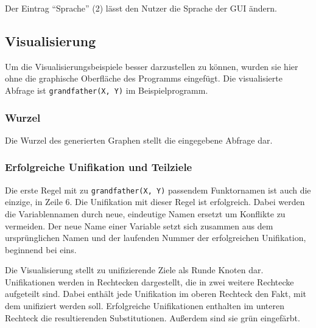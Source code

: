 \documentclass[parskip=full,11pt,twoside]{scrartcl}
\begin{document}
Der Eintrag \enquote{Sprache} (2) lässt den Nutzer die Sprache der GUI ändern.

\subsection{Visualisierung}

Um die Visualisierungsbeispiele besser darzustellen zu können, wurden sie hier ohne die graphische Oberfläche des Programms eingefügt.
Die visualisierte Abfrage ist \texttt{grandfather(X, Y)} im Beispielprogramm.

\subsubsection{Wurzel}

\begin{minipage}{\linewidth}
\end{minipage}

Die Wurzel des generierten Graphen stellt die eingegebene Abfrage dar.

\subsubsection{Erfolgreiche Unifikation und Teilziele}

Die erste Regel mit zu \texttt{grandfather(X, Y)} passendem Funktornamen ist auch die einzige, in Zeile 6.
Die Unifikation mit dieser Regel ist erfolgreich.
Dabei werden die Variablennamen durch neue, eindeutige Namen ersetzt um Konflikte zu vermeiden.
Der neue Name einer Variable setzt sich zusammen aus dem ursprünglichen Namen und der laufenden Nummer der erfolgreichen Unifikation, beginnend bei eins.

\begin{minipage}{\linewidth}
\end{minipage}

Die Visualisierung stellt zu unifizierende Ziele als Runde Knoten dar.
Unifikationen werden in  Rechtecken dargestellt, die in zwei weitere Rechtecke aufgeteilt sind.
Dabei enthält jede Unifikation im oberen Rechteck den Fakt, mit dem unifiziert werden soll.
Erfolgreiche Unifikationen enthalten im unteren Rechteck die resultierenden Substitutionen.
Außerdem sind sie grün eingefärbt.
\end{document}
